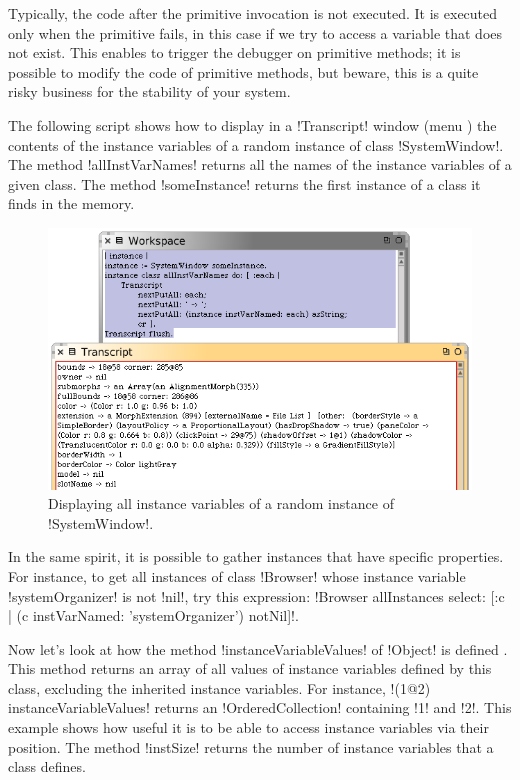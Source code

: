 \documentclass[a4paper,10pt,twoside]{book}
\begin{document}
Typically, the code after the primitive invocation is not executed.
It is executed only when the primitive fails, \eg in this case if we try to access a variable that does not exist.
This enables to trigger the debugger on primitive methods; it is possible to modify the code of primitive methods, but beware, this is a quite risky business for the stability of your \sq system.

The following script shows how to display in a \ct!Transcript! window (menu ) the contents of the instance variables of a random instance of class \ct!SystemWindow!.
The method \ct!allInstVarNames! returns all the names of the instance variables of a given class.
The method \ct!someInstance! returns the first instance of a class it finds in the memory.

\begin{figure}[ht]\centering
	\includegraphics[width=.75\linewidth]{allInstanceVariables}
	\caption{Displaying all instance variables of a random instance of \ct!SystemWindow!.\label{fig:allInstanceVariables}}
\end{figure}

In the same spirit, it is possible to gather instances that have specific properties.
For instance, to get all instances of class \ct!Browser! whose instance variable \ct!systemOrganizer! is not \ct!nil!, try this expression: \ct!Browser allInstances select: [:c | (c instVarNamed: 'systemOrganizer') notNil]!.

Now let's look at how the method \ct!instanceVariableValues! of \ct!Object! is defined . This method returns an array of all values of instance variables defined by this class, excluding the inherited instance variables.
For instance, \ct!(1@2) instanceVariableValues! returns an \ct!OrderedCollection! containing \ct!1! and \ct!2!.
This example shows how useful it is to be able to access instance variables via their position.
The method \ct!instSize! returns the number of instance variables that a class defines.
\end{document}
